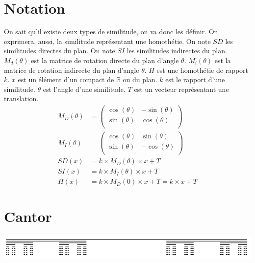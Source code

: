 \documentclass[a4paper, 12pt]{report}
\begin{document}
		\section{Notation}
			On sait qu'il existe deux types de similitude, on va donc les définir. On exprimera, aussi, la similitude représentant une homothétie.
			\vspace{.3cm}
			On note $SD$ les similitudes directes du plan.\newline
			On note $SI$ les similitudes indirectes du plan.\newline
			$M_d(\theta)$ est la matrice de rotation directe du plan d'angle $\theta$.\newline
			$M_i(\theta)$ est la matrice de rotation indirecte du plan d'angle $\theta$.\newline
			$H$ est une homothétie de rapport $k$.
			$x$ est un élément d'un compact de $\mathds{R}$ ou du plan.\newline
			$k$ est le rapport d'une similitude.\newline
			$\theta$ est l'angle d'une similitude.\newline
			$T$ est un vecteur représentant une translation.\newline
			\begin{align*}
				M_D(\theta)&=\left(	\begin{array}{ccc}
								\cos(\theta) &  -\sin(\theta) \\
								\sin(\theta) &  \cos(\theta)  \\
									\end{array} \right)\\
				M_I(\theta)&=\left(	\begin{array}{ccc}
								\cos(\theta) &  \sin(\theta) \\
								\sin(\theta) &  -\cos(\theta)  \\
									\end{array} \right)\\
				SD(x)&=k\times M_D(\theta)\times x + T\\
				SI(x)&=k\times M_I(\theta)\times x + T\\
				H(x)&=k\times M_D(0)\times x +T=k\times x+T
			\end{align*}
\newpage
		\section{Cantor}
			\includegraphics[scale=0.8]{Images/cantor}
\end{document}
